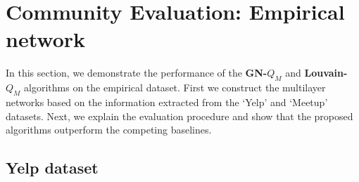 \section{Community Evaluation: Empirical network}
\label{emp}
In this section, we demonstrate the performance of the \textbf{GN-$Q_M$} and \textbf{Louvain-$Q_M$} algorithms on the empirical dataset.
First we construct the multilayer networks based on the information extracted from the `Yelp' and `Meetup' datasets. Next, we explain 
the evaluation procedure and show that the proposed algorithms outperform the competing baselines.

\subsection{Yelp dataset}

